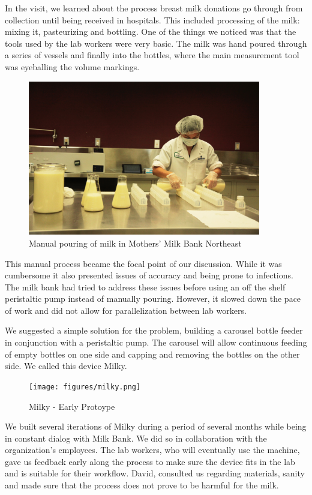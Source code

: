 In the visit, we learned about the process breast milk donations go through from collection until being received in hospitals. This included processing of the milk: mixing it, pasteurizing and bottling. One of the things we noticed was that the tools used by the lab workers were very basic. The milk was hand poured through a series of vessels and finally into the bottles, where the main measurement tool was eyeballing the volume markings. 

   \begin{figure}[thpb]
      \centering
      \includegraphics[width=4in]{figures/mmne-manual.png}
      \caption{Manual pouring of milk in Mothers' Milk Bank Northeast}
      \label{mmne-manual}
   \end{figure}

This manual process became the focal point of our discussion. While it was cumbersome it also presented issues of accuracy and being prone to infections. The milk bank had tried to address these issues before using an off the shelf peristaltic pump instead of manually pouring. However, it slowed down the pace of work and did not allow for parallelization between lab workers. 

We suggested a simple solution for the problem, building a carousel bottle feeder in conjunction with a peristaltic pump. The carousel will allow continuous feeding of empty bottles on one side and capping and removing the bottles on the other side. We called this device Milky. 

   \begin{figure}[thpb]
      \centering
      \texttt{[image: figures/milky.png]}
      \caption{Milky - Early Protoype}
      \label{milky}
   \end{figure}

We built several iterations of Milky during a period of several months while being in constant dialog with Milk Bank. We did so in collaboration with the organization's employees. The lab workers, who will eventually use the machine, gave us feedback early along the process to make sure the device fits in the lab and is suitable for their workflow. David, consulted us regarding materials, sanity and made sure that the process does not prove to be harmful for the milk. 

